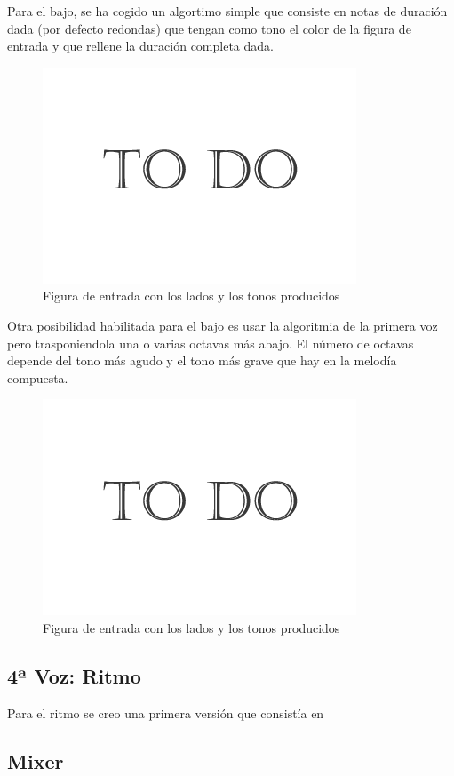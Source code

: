 Para el bajo, se ha cogido un algortimo simple que consiste en notas de duración dada (por defecto redondas) que tengan como tono el color de la figura de entrada y que rellene la duración completa dada.

		\begin{figure}[htbp]
		\centering
		\hspace*{0.0in}
		\includegraphics[scale=0.57]{graphics/todo.png}
		\caption{Figura de entrada con los lados y los tonos producidos}
		\label{fig:Figura1Voz3}
		\end{figure}

Otra posibilidad habilitada para el bajo es usar la algoritmia de la primera voz pero trasponiendola una o varias octavas más abajo. El número de octavas depende del tono más agudo y el tono más grave que hay en la melodía compuesta.

		\begin{figure}[htbp]
		\centering
		\hspace*{0.0in}
		\includegraphics[scale=0.57]{graphics/todo.png}
		\caption{Figura de entrada con los lados y los tonos producidos}
		\label{fig:Figura2Voz3}
		\end{figure}

\subsection{4ª Voz: Ritmo}

Para el ritmo se creo una primera versión que consistía en 

\subsection{Mixer}
























